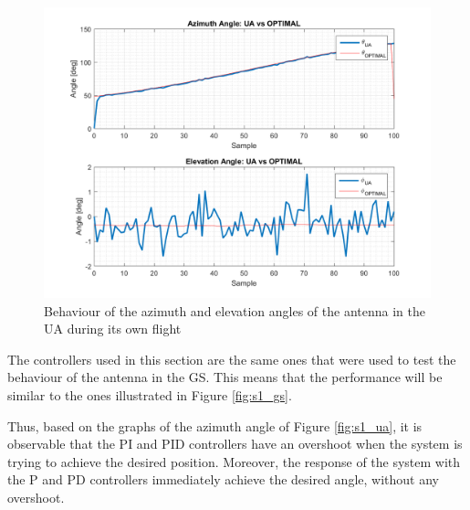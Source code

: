 \begin{figure}[H]
	\centering
	\includegraphics[scale=0.75]{figures/s1_pd_ua.png}
	\caption{Behaviour of the azimuth and elevation angles of the antenna in the UA during its own flight}
	\label{fig:s1_pd_ua_alone}
\end{figure}

The controllers used in this section are the same ones that were used to test the behaviour of the antenna in the GS. This means that the performance will be similar to the ones illustrated in Figure \ref{fig:s1_gs}.

Thus, based on the graphs of the azimuth angle of Figure \ref{fig:s1_ua}, it is observable that the PI and PID controllers have an overshoot when the system is trying to achieve the desired position. Moreover, the response of the system with the P and PD controllers immediately achieve the desired angle, without any overshoot.

